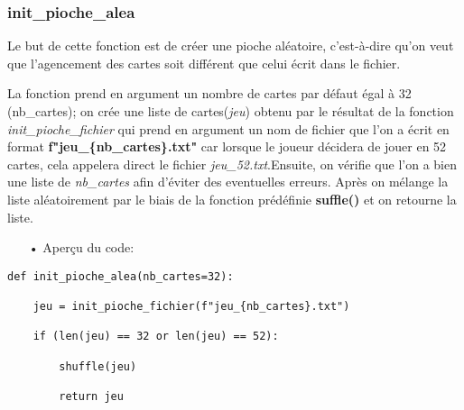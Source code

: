 	\subsubsection{init\_pioche\_alea}
	Le but de cette fonction est de créer une pioche aléatoire, c'est-à-dire qu'on veut que l'agencement des cartes soit différent que celui écrit dans le fichier.
	\par La fonction prend en argument un nombre de cartes par défaut égal à 32 (nb\_cartes); on crée une liste de cartes(\emph{jeu}) obtenu par le résultat de la fonction \emph{init\_pioche\_fichier} qui prend en argument un nom de fichier que l'on a écrit en format \textbf{f"jeu\_\{nb\_cartes\}.txt"} car lorsque le joueur décidera de jouer en 52 cartes, cela appelera direct le fichier \emph{jeu\_52.txt}.Ensuite, on vérifie que l'on a bien une liste de \emph{nb\_cartes} afin d'éviter des eventuelles erreurs. Après on mélange la liste aléatoirement par le biais de la fonction prédéfinie \textbf{suffle()} et on retourne la liste.
	\\
	\begin{itemize}
	\color{blue}\item[•]Aperçu du code:
	\end{itemize}
	
	\lstset{language=Python}
	\lstset{frame=lines}
	\lstset{basicstyle=\footnotesize}
	\begin{lstlisting}
def init_pioche_alea(nb_cartes=32):
    
    jeu = init_pioche_fichier(f"jeu_{nb_cartes}.txt")
    
    if (len(jeu) == 32 or len(jeu) == 52):
    
        shuffle(jeu)
        
        return jeu
	\end{lstlisting}